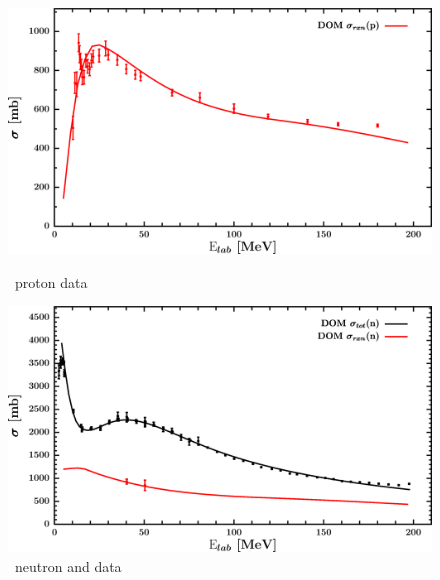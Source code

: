 \begin{figure}[H]
    \centering
    \begin{minipage}{0.45\textwidth}
        \centering
        \includegraphics[width=1.0\textwidth]{figures/ca40_protonInelastic.png}
        \caption{\caForty\ proton \rxn data}
        \label{DOMFitData_ca40_proton_inelastic}
    \end{minipage}\hfill
    \begin{minipage}{0.45\textwidth}
        \centering
        \includegraphics[width=1.0\textwidth]{figures/ca40_neutronInelastic.png}
        \caption{\caForty\ neutron \rxn and \tot data}
        \label{DOMFitData_ca40_neutron_inelastic}
    \end{minipage}
\end{figure}

\afterpage{\clearpage}

